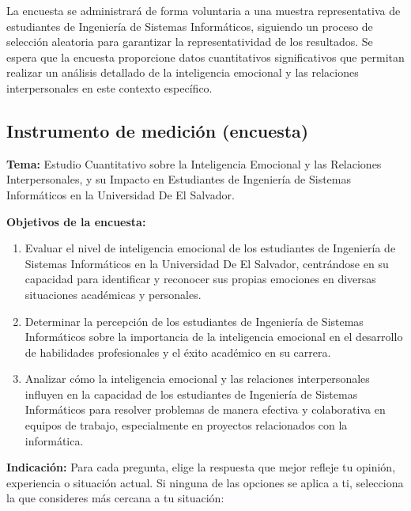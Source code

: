 \documentclass[journal]{IEEEtran}
\begin{document}
La encuesta se administrará de forma voluntaria a una muestra representativa de estudiantes de Ingeniería de Sistemas Informáticos, siguiendo un proceso de selección aleatoria para garantizar la representatividad de los resultados. Se espera que la encuesta proporcione datos cuantitativos significativos que permitan realizar un análisis detallado de la inteligencia emocional y las relaciones interpersonales en este contexto específico.

\subsection{Instrumento de medición (encuesta)}

\textbf{Tema:} Estudio Cuantitativo sobre la Inteligencia Emocional y las Relaciones Interpersonales, y su Impacto en Estudiantes de Ingeniería de Sistemas Informáticos en la Universidad De El Salvador.

\textbf{Objetivos de la encuesta:}
\begin{enumerate}
	\item Evaluar el nivel de inteligencia emocional de los estudiantes de Ingeniería de Sistemas Informáticos en la Universidad De El Salvador, centrándose en su capacidad para identificar y reconocer sus propias emociones en diversas situaciones académicas y personales.
	\item Determinar la percepción de los estudiantes de Ingeniería de Sistemas Informáticos sobre la importancia de la inteligencia emocional en el desarrollo de habilidades profesionales y el éxito académico en su carrera.
	\item Analizar cómo la inteligencia emocional y las relaciones interpersonales influyen en la capacidad de los estudiantes de Ingeniería de Sistemas Informáticos para resolver problemas de manera efectiva y colaborativa en equipos de trabajo, especialmente en proyectos relacionados con la informática.
\end{enumerate}

\textbf{Indicación:} Para cada pregunta, elige la respuesta que mejor refleje tu opinión, experiencia o situación actual. Si ninguna de las opciones se aplica a ti, selecciona la que consideres más cercana a tu situación:
\end{document}
